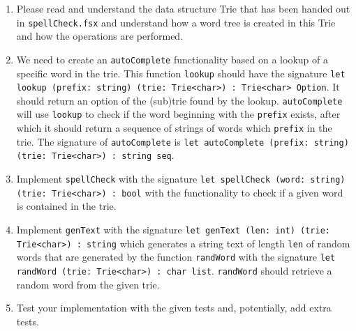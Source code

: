\begin{enumerate}
  \item Please read and understand the data structure Trie that has been handed out in \texttt{spellCheck.fsx} and understand how a word tree is created in this Trie and how the operations are performed. 
  \item We need to create an \texttt{autoComplete} functionality based on a lookup of a specific word in the trie. This function \texttt{lookup} should have the signature \texttt{let lookup (prefix: string) (trie: Trie<char>) : Trie<char> Option}. It should return an option of the (sub)trie found by the lookup. \texttt{autoComplete} will use \texttt{lookup} to check if the word beginning with the \texttt{prefix} exists, after which it should return a sequence of strings of words which \texttt{prefix} in the trie. The signature of \texttt{autoComplete} is \texttt{let autoComplete (prefix: string) (trie: Trie<char>) : string seq}. 
  \item Implement \texttt{spellCheck} with the signature \texttt{let spellCheck (word: string) (trie: Trie<char>) : bool} with the functionality to check if a given word is contained in the trie. 
  \item Implement \texttt{genText} with the signature \texttt{let genText (len: int) (trie: Trie<char>) : string} which generates a string text of length \texttt{len} of random words that are generated by the function \texttt{randWord} with the signature \texttt{let randWord (trie: Trie<char>) : char list}. \texttt{randWord} should retrieve a random word from the given trie. 
  \item Test your implementation with the given tests and, potentially, add extra tests. 
\end{enumerate}
